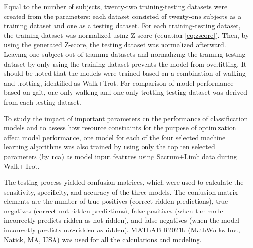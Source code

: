 Equal to the number of subjects, twenty-two training-testing datasets were created from the parameters; each dataset consisted of twenty-one subjects as a training dataset and one as a testing dataset. For each training-testing dataset, the training dataset was normalized using Z-score (equation \ref{eq:zscore}). Then, by using the generated Z-score, the testing dataset was normalized afterward. Leaving one subject out of training datasets and normalizing the training-testing dataset by only using the training dataset prevents the model from overfitting. It should be noted that the models were trained based on a combination of walking and trotting, identified as Walk+Trot. For comparison of model performance based on gait, one only walking and one only trotting testing dataset was derived from each testing dataset.

To study the impact of important parameters on the performance of classification models and to assess how resource constraints for the purpose of optimization affect model performance, one model for each of the four selected machine learning algorithms was also trained by using only the top ten selected parameters (by \gls{nca}) as model input features using Sacrum+Limb data during Walk+Trot. 

The testing process yielded confusion matrices, which were used to calculate the sensitivity, specificity, and accuracy of the three models. The confusion matrix elements are the number of true positives (correct ridden predictions), true negatives (correct not-ridden predictions), false positives (when the model incorrectly predicts ridden as not-ridden), and false negatives (when the model incorrectly predicts not-ridden as ridden). MATLAB R2021b (MathWorks Inc., Natick, MA, USA) was used for all the calculations and modeling.